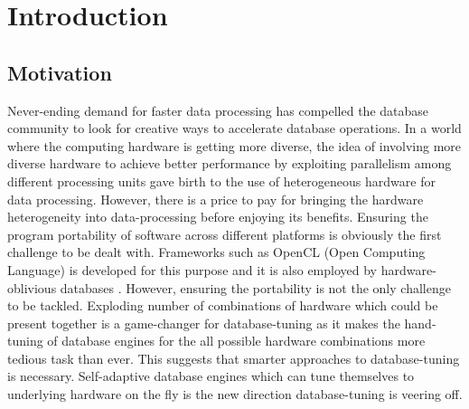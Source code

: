 
\chapter{Introduction} %

\label{Chapter1} %



\section{Motivation}
\label{motivation}

Never-ending demand for faster data processing has compelled the database community to look for creative ways to accelerate database operations. In a world where the computing hardware is getting more diverse, the idea of involving more diverse hardware to achieve better performance by exploiting parallelism among different processing units gave birth to the use of heterogeneous hardware for data processing. However, there is a price to pay for bringing the hardware heterogeneity into data-processing before enjoying its benefits. Ensuring the program portability of software across different platforms is obviously the first challenge to be dealt with. Frameworks such as OpenCL (Open Computing Language) is developed for this purpose and it is also employed by hardware-oblivious databases \cite{heimel_hardware-oblivious_2013}. However, ensuring the portability is not the only challenge to be tackled. Exploding number of combinations of hardware which could be present together is a game-changer for database-tuning as it makes the hand-tuning of database engines for the all possible hardware combinations more tedious task than ever. This suggests that smarter approaches to database-tuning is necessary. Self-adaptive database engines which can tune themselves to underlying hardware on the fly is the new direction database-tuning is veering off.

